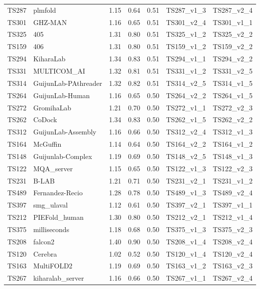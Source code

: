 \begin{longtable}{lllllll}
TS287 & plmfold & 1.15 & 0.64 & 0.51 & TS287\_v1\_3 & TS287\_v2\_4 \\ 
TS301 & GHZ-MAN & 1.16 & 0.65 & 0.51 & TS301\_v2\_4 & TS301\_v1\_1 \\ 
TS325 & 405 & 1.31 & 0.80 & 0.51 & TS325\_v1\_2 & TS325\_v2\_2 \\ 
TS159 & 406 & 1.31 & 0.80 & 0.51 & TS159\_v1\_2 & TS159\_v2\_2 \\ 
TS294 & KiharaLab & 1.34 & 0.83 & 0.51 & TS294\_v1\_1 & TS294\_v2\_2 \\ 
TS331 & MULTICOM\_AI & 1.32 & 0.81 & 0.51 & TS331\_v1\_2 & TS331\_v2\_5 \\ 
TS314 & GuijunLab-PAthreader & 1.32 & 0.82 & 0.51 & TS314\_v2\_5 & TS314\_v1\_5 \\ 
TS264 & GuijunLab-Human & 1.16 & 0.65 & 0.50 & TS264\_v2\_2 & TS264\_v1\_5 \\ 
TS272 & GromihaLab & 1.21 & 0.70 & 0.50 & TS272\_v1\_1 & TS272\_v2\_3 \\ 
TS262 & CoDock & 1.34 & 0.83 & 0.50 & TS262\_v1\_5 & TS262\_v2\_2 \\ 
TS312 & GuijunLab-Assembly & 1.16 & 0.66 & 0.50 & TS312\_v2\_4 & TS312\_v1\_3 \\ 
TS164 & McGuffin & 1.14 & 0.64 & 0.50 & TS164\_v2\_2 & TS164\_v1\_2 \\ 
TS148 & Guijunlab-Complex & 1.19 & 0.69 & 0.50 & TS148\_v2\_5 & TS148\_v1\_3 \\ 
TS122 & MQA\_server & 1.15 & 0.65 & 0.50 & TS122\_v1\_3 & TS122\_v2\_3 \\ 
TS231 & B-LAB & 1.21 & 0.71 & 0.50 & TS231\_v2\_1 & TS231\_v1\_2 \\ 
TS489 & Fernandez-Recio & 1.28 & 0.78 & 0.50 & TS489\_v1\_3 & TS489\_v2\_4 \\ 
TS397 & smg\_ulaval & 1.12 & 0.61 & 0.50 & TS397\_v2\_1 & TS397\_v1\_1 \\ 
TS212 & PIEFold\_human & 1.30 & 0.80 & 0.50 & TS212\_v2\_1 & TS212\_v1\_4 \\ 
TS375 & milliseconds & 1.18 & 0.68 & 0.50 & TS375\_v1\_3 & TS375\_v2\_3 \\ 
TS208 & falcon2 & 1.40 & 0.90 & 0.50 & TS208\_v1\_4 & TS208\_v2\_4 \\ 
TS120 & Cerebra & 1.02 & 0.52 & 0.50 & TS120\_v1\_4 & TS120\_v2\_4 \\ 
TS163 & MultiFOLD2 & 1.19 & 0.69 & 0.50 & TS163\_v1\_2 & TS163\_v2\_3 \\ 
TS267 & kiharalab\_server & 1.16 & 0.66 & 0.50 & TS267\_v1\_1 & TS267\_v2\_4 \\ 

\end{longtable}
